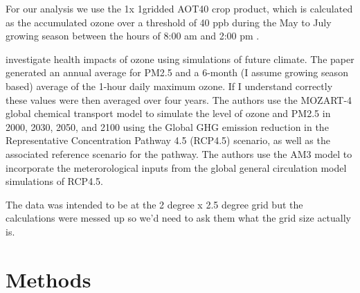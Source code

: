 \documentclass[10pt]{amsart}
\begin{document}
For our analysis we use the 1\degree x 1\degree gridded AOT40 crop product, which is calculated as the accumulated ozone over a threshold of 40 ppb during the May to July growing season between the hours of 8:00 am and 2:00 pm \parencite{sofen:2016aa}.

\cite{} investigate health impacts of ozone using simulations of future climate. 
The \cite{j:2013aa} paper generated an annual average for PM2.5 and a 6-month (I assume growing season based) average of the 1-hour daily maximum ozone. 
If I understand correctly these values were then averaged over four years. 
The authors use the MOZART-4 global chemical transport model to simulate the level of ozone and PM2.5 in 2000, 2030, 2050, and 2100 using the Global GHG emission reduction in the Representative Concentration Pathway 4.5 (RCP4.5) scenario, as well as the associated reference scenario for the pathway.
The authors use the AM3 model to incorporate the meterorological inputs from the global general circulation model simulations of RCP4.5.  



The data was intended to be at the 2 degree x 2.5 degree grid but the calculations were messed up so we'd need to ask them what the grid size actually is. 


\section{Methods}


\printbibliography
\end{document}
